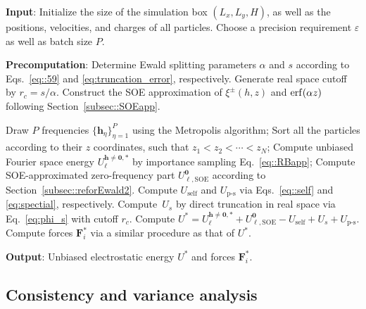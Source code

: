 \begin{algorithm}[ht] 
	\caption{The random batch sum-of-exponentials Ewald2D method}
	\begin{algorithmic}[1]
		
		\State \textbf{Input}: Initialize the size of the simulation box $(L_x,L_y, H)$, as well as the positions, velocities, and charges of all particles. Choose a precision requirement $\varepsilon$ as well as batch size $P$.
		
		\State \textbf{Precomputation}: Determine Ewald splitting parameters $\alpha$ and $s$ according to Eqs.~\eqref{eq::59} and \eqref{eq:truncation_error}, respectively. Generate real space cutoff by $r_c=s/\alpha$. Construct the SOE approximation of $\xi^{\pm}(h,z)$ and $\operatorname{erf}(\alpha z)$ following Section~\ref{subsec::SOEapp}.
		
		\Procedure{}       
		\State Draw $P$ frequencies $\{\bm{h}_{\eta}\}_{\eta=1}^{P}$ using the Metropolis algorithm;
		\State Sort all the particles according to their $z$ coordinates, such that $z_1 < z_2 < \cdots < z_N$;
		\State Compute unbiased Fourier space energy $U_{\ell}^{\bm{h}\neq\bm{0},*}$ by importance sampling Eq.~\eqref{eq::RBapp};
		\State Compute SOE-approximated zero-frequency part $U_{\ell,\text{SOE}}^{\bm{0}}$ according to Section~\ref{subsec::reforEwald2}.
		\State Compute $U_{\text{self}}$ and $U_{\text{p-s}}$ via Eqs.~\eqref{eq::self} and \eqref{eq:spectial}, respectively.
		\State Compute~$U_{s}$ by direct truncation in real space via Eq.~\eqref{eq:phi_s} with cutoff $r_c$. %
		\State Compute $U^{*}=U_{\ell}^{\bm{h}\neq\bm{0},*}+U_{\ell,\text{SOE}}^{\bm{0}}-U_{\text{self}}+U_{s}+U_{\text{p-s}}$.
		\State Compute forces $\bm{F}_{i}^{*}$ via a similar procedure as that of $U^{*}$.
		\EndProcedure
		
		\State \textbf{Output}: Unbiased electrostatic energy $U^{*}$ and forces $\bm{F}_{i}^{*}$.
		
	\end{algorithmic}\label{alg:RBSE2D}
\end{algorithm}



\subsection{Consistency and variance analysis}
\label{subsec::consis}

